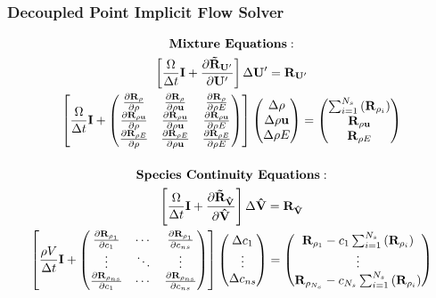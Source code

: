 \documentclass{beamer}
\begin{document}
\begin{frame}
  \frametitle{Decoupled Point Implicit Flow Solver}
  \vspace{-0.5cm}
  \small
\begin{gather*}
    \text{\bf{Mixture Equations}}: \\
    \left[ 
    \frac{\vol}{\Delta t}\mi + \drup
    \right] \Delta \Up
  =
  \res{\Up} \\
  \left[ 
    \frac{\vol}{\Delta t}\mi + 
    \begin{pmatrix}
      \rdiff{\rho}{\rho} & \rdiff{\rho}{\rho \vu} & \rdiff{\rho}{\rho E} \\
      \rdiff{\rho \vu}{\rho} & \rdiff{\rho \vu}{\rho \vu} & \rdiff{\rho \vu}{\rho E} \\
      \rdiff{\rho E}{\rho} & \rdiff{\rho E}{\rho \vu} & \rdiff{\rho E}{\rho E}
    \end{pmatrix}
  \right]
  \begin{pmatrix}
    \Delta \rho \\
    \Delta \rho \vu \\
    \Delta \rho E
  \end{pmatrix}
  =
  \begin{pmatrix}
    \resrho \\
    \res{\rho \vu} \\
    \res{\rho E}
  \end{pmatrix} \\[12pt]
    \text{\bf{Species Continuity Equations}}: \\
    \left[ 
    \frac{\vol}{\Delta t}\mi + \drvhat
    \right] \Delta \Vhat
    =
    \res{\Vhat} \\
  \left[
    \frac{\rho V}{\Delta t}\mi + 
    \begin{pmatrix}
      \rdiff{\rho_1}{c_1} & \cdots & \rdiff{\rho_{1}}{c_{ns}} \\
      \vdots & \ddots & \vdots \\
      \rdiff{\rho_{ns}}{c_1} & \cdots & \rdiff{\rho_{ns}}{c_{ns}}
    \end{pmatrix}
  \right]
  \begin{pmatrix}
    \Delta c_1 \\
    \vdots \\
    \Delta c_{ns}
  \end{pmatrix}
  =
  \begin{pmatrix}
    \res{\rho_1} - c_1 \resrho \\
    \vdots \\
    \res{\rho_{N_s}} - c_{N_s} \resrho
  \end{pmatrix}
\end{gather*}
\end{frame}
\end{document}
